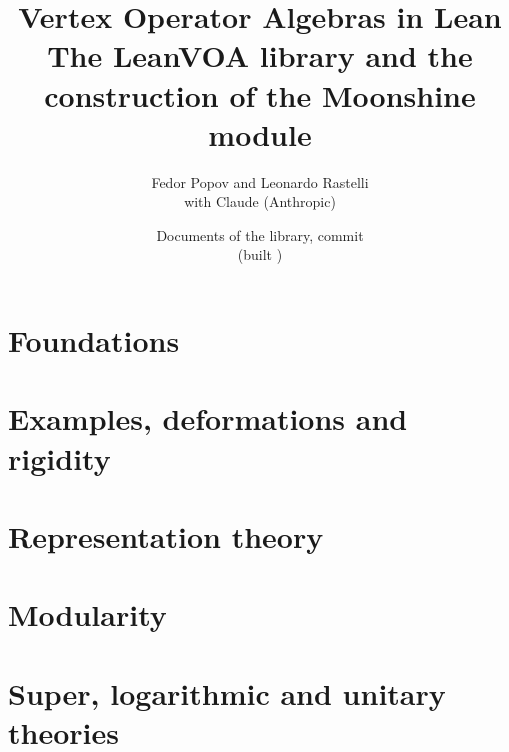 \documentclass[11pt,openany]{book}
\title{\Huge Vertex Operator Algebras in Lean\\[0.6em]
  \Large The LeanVOA library and the construction of the Moonshine module}
\author{Fedor Popov and Leonardo Rastelli\\[0.3em]\small with Claude (Anthropic)}
\date{Documents \bookrelease{} of the library, commit \texttt{\bookcommit}\\ \small(built \bookdate)}
\theoremstyle{definition}
\theoremstyle{plain}
\begin{document}
\frontmatter
\maketitle
\tableofcontents

\mainmatter
\part{Foundations}
\part{Examples, deformations and rigidity}
\part{Representation theory}
\part{Modularity}
\part{Super, logarithmic and unitary theories}
\end{document}
